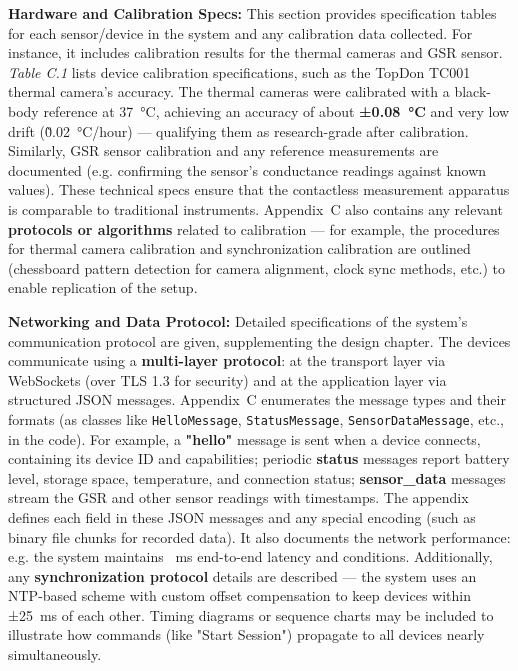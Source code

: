 \textbf{Hardware and Calibration Specs:} This section provides specification
tables for each sensor/device in the system and any calibration data
collected. For instance, it includes calibration results for the thermal
cameras and GSR sensor. \textit{Table C.1} lists device calibration
specifications, such as the TopDon TC001 thermal camera's accuracy. The
thermal cameras were calibrated with a black-body reference at 37 °C,
achieving an accuracy of about \textbf{±0.08 °C} and very low drift
(\~0.02 °C/hour) --- qualifying them as research-grade after
calibration\cite{ref29}.
Similarly, GSR sensor calibration and any reference measurements are
documented (e.g. confirming the sensor's conductance readings against
known values). These technical specs ensure that the contactless
measurement apparatus is comparable to traditional instruments.
Appendix C also contains any relevant \textbf{protocols or algorithms}
related to calibration --- for example, the procedures for thermal camera
calibration and synchronization calibration are outlined (chessboard
pattern detection for camera alignment, clock sync methods, etc.) to
enable replication of the
setup\cite{ref30}\cite{ref31}.

\textbf{Networking and Data Protocol:} Detailed specifications of the
system's communication protocol are given, supplementing the design
chapter. The devices communicate using a \textbf{multi-layer protocol}: at
the transport layer via WebSockets (over TLS 1.3 for security) and at
the application layer via structured JSON
messages\cite{ref2}.
Appendix C enumerates the message types and their formats (as classes
like \texttt{HelloMessage}, \texttt{StatusMessage}, \texttt{SensorDataMessage}, etc., in the
code). For example, a \textbf{"hello"} message is sent when a device
connects, containing its device ID and capabilities; periodic \textbf{status}
messages report battery level, storage space, temperature, and
connection status; \textbf{sensor_data} messages stream the GSR and other
sensor readings with
timestamps\cite{ref32}\cite{ref33}.
The appendix defines each field in these JSON messages and any special
encoding (such as binary file chunks for recorded data). It also
documents the network performance: e.g. the system maintains  ms
end-to-end latency and %
conditions\cite{ref2}.
Additionally, any \textbf{synchronization protocol} details are described ---
the system uses an NTP-based scheme with custom offset compensation to
keep devices within ±25 ms of each
other\cite{ref34}.
Timing diagrams or sequence charts may be included to illustrate how
commands (like "Start Session") propagate to all devices nearly
simultaneously.

